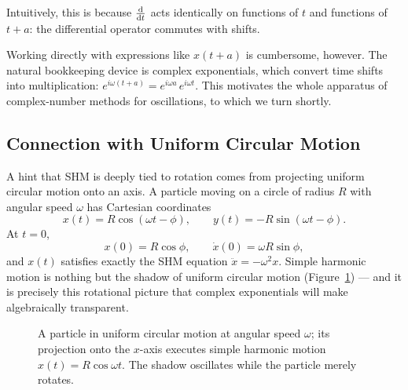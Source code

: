 Intuitively, this is because $\dv{}{t}$ acts identically on functions of $t$ and functions of $t + a$: the differential operator commutes with shifts.

Working directly with expressions like $x(t + a)$ is cumbersome, however. The natural bookkeeping device is complex exponentials, which convert time shifts into multiplication: $e^{i\omega(t+a)} = e^{i\omega a}\,e^{i\omega t}$. This motivates the whole apparatus of complex-number methods for oscillations, to which we turn shortly.

\subsection{Connection with Uniform Circular Motion}

A hint that SHM is deeply tied to rotation comes from projecting uniform circular motion onto an axis. A particle moving on a circle of radius $R$ with angular speed $\omega$ has Cartesian coordinates
\begin{equation}
    x(t) = R\cos(\omega t - \phi), \qquad y(t) = -R\sin(\omega t - \phi).
\end{equation}
At $t = 0$,
\begin{equation}
    x(0) = R\cos\phi, \qquad \dot{x}(0) = \omega R\sin\phi,
\end{equation}
and $x(t)$ satisfies exactly the SHM equation $\ddot{x} = -\omega^2 x$. Simple harmonic motion is nothing but the shadow of uniform circular motion (Figure~\ref{fig:circular-shadow}) --- and it is precisely this rotational picture that complex exponentials will make algebraically transparent.

\begin{figure}[ht]
    \centering
    \caption{A particle in uniform circular motion at angular speed $\omega$; its projection onto the $x$-axis executes simple harmonic motion $x(t)=R\cos\omega t$. The shadow oscillates while the particle merely rotates.}
    \label{fig:circular-shadow}
\end{figure}

